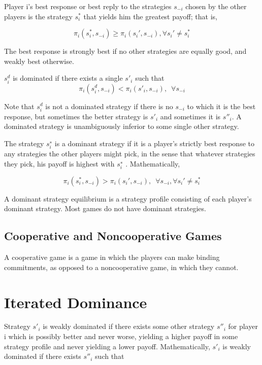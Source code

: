 \documentclass{article}
\begin{document}
Player i’s best response or best reply to the strategies $ s_{−i} $ chosen by the other players
is the strategy $ s_i^* $ that yields him the greatest payoff; that is,

\[
\pi_i(s_i^*,s_{-i}) \ge \pi_i(s_i' ,s_{-i}),\forall s_i'\ne s_i^*
\]

The best response is strongly best if no other strategies are equally good, and weakly best
otherwise.

\hspace*{\fill}

$ s^d_i $ is dominated if there exists a single $ s'_i $ such that
\[
\pi_i(s^d_i,s_{-i})<\pi_i(s'_i,s_{-i}),\enspace \forall s_{-i}
\]

Note that $ s^d_i $
is not a dominated strategy if there is no $ s_{−i} $ to which it is the best response,
but sometimes the better strategy is $ s'_i $ and sometimes it is $ s''_i $. A dominated strategy is unambiguously inferior to some single other strategy.

\hspace*{\fill}

The strategy $ s^∗_i $ is a dominant strategy if it is a player’s strictly best response to any
strategies the other players might pick, in the sense that whatever strategies they pick, his
payoff is highest with $ s^∗_i $ . Mathematically,

\[
\pi_i(s_i^*,s_{-i}) > \pi_i(s_i' ,s_{-i}),\enspace \forall s_{-i},\forall s_i'\ne s_i^*
\]

A dominant strategy equilibrium is a strategy profile consisting of each player’s dominant
strategy. Most games do not have dominant strategies.

\subsection{Cooperative and Noncooperative Games}

A cooperative game is a game in which the players can make binding commitments, as
opposed to a noncooperative game, in which they cannot.

\section{Iterated Dominance}

Strategy $ s'_i $ is weakly dominated if there exists some other strategy $ s''_i $ for player i which is
possibly better and never worse, yielding a higher payoff in some strategy profile and never
yielding a lower payoff. Mathematically, $ s'_i $ is weakly dominated if there exists $ s''_i $ such that
\end{document}
